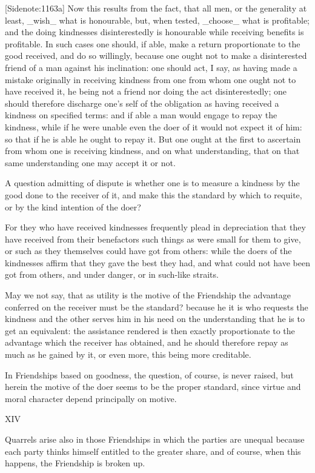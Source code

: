 [Sidenote:1163a] Now this results from the fact, that all men, or the
generality at least, _wish_ what is honourable, but, when tested,
_choose_ what is profitable; and the doing kindnesses disinterestedly
is honourable while receiving benefits is profitable. In such cases one
should, if able, make a return proportionate to the good received, and
do so willingly, because one ought not to make a disinterested friend of
a man against his inclination: one should act, I say, as having made a
mistake originally in receiving kindness from one from whom one ought
not to have received it, he being not a friend nor doing the act
disinterestedly; one should therefore discharge one's self of the
obligation as having received a kindness on specified terms: and if able
a man would engage to repay the kindness, while if he were unable even
the doer of it would not expect it of him: so that if he is able he
ought to repay it. But one ought at the first to ascertain from whom
one is receiving kindness, and on what understanding, that on that same
understanding one may accept it or not.

A question admitting of dispute is whether one is to measure a kindness
by the good done to the receiver of it, and make this the standard by
which to requite, or by the kind intention of the doer?

For they who have received kindnesses frequently plead in depreciation
that they have received from their benefactors such things as were small
for them to give, or such as they themselves could have got from others:
while the doers of the kindnesses affirm that they gave the best they
had, and what could not have been got from others, and under danger, or
in such-like straits.

May we not say, that as utility is the motive of the Friendship the
advantage conferred on the receiver must be the standard? because he it
is who requests the kindness and the other serves him in his need on the
understanding that he is to get an equivalent: the assistance rendered
is then exactly proportionate to the advantage which the receiver has
obtained, and he should therefore repay as much as he gained by it, or
even more, this being more creditable.

In Friendships based on goodness, the question, of course, is never
raised, but herein the motive of the doer seems to be the proper
standard, since virtue and moral character depend principally on motive.


XIV

Quarrels arise also in those Friendships in which the parties are
unequal because each party thinks himself entitled to the greater share,
and of course, when this happens, the Friendship is broken up.

